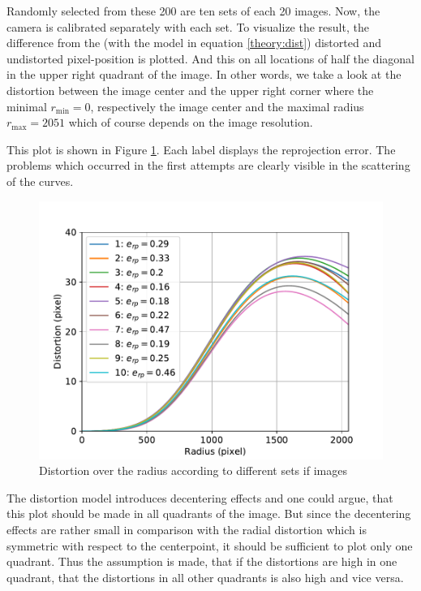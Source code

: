 Randomly selected from these 200 are ten sets of each 20 images.
Now, the camera is calibrated separately with each set.
To visualize the result, the difference from the (with the model in equation \ref{theory:dist}) distorted and undistorted pixel-position is plotted. 
And this on all locations of half the diagonal in the upper right quadrant of the image.
In other words, we take a look at the distortion between the image center and the upper right corner where the minimal $r_{\text{min}}=0$, respectively the image center and the maximal radius $r_{\text{max}}=2051$ which of course depends on the image resolution.

This plot is shown in Figure \ref{development:stat}.
Each label displays the reprojection error.
The problems which occurred in the first attempts are clearly visible in the scattering of the curves.

\begin{figure}[ht]
	\centering
	\includegraphics[width=0.9\linewidth]{3-development/calibration/images/stat.pdf}
	\caption{Distortion over the radius according to different sets if images\label{development:stat}}
\end{figure}

The distortion model introduces decentering effects and one could argue, that this plot should be made in all quadrants of the image.
But since the decentering effects are rather small in comparison with the radial distortion which is symmetric with respect to the centerpoint, it should be sufficient to plot only one quadrant.
Thus the assumption is made, that if the distortions are high in one quadrant, that the distortions in all other quadrants is also high and vice versa.

